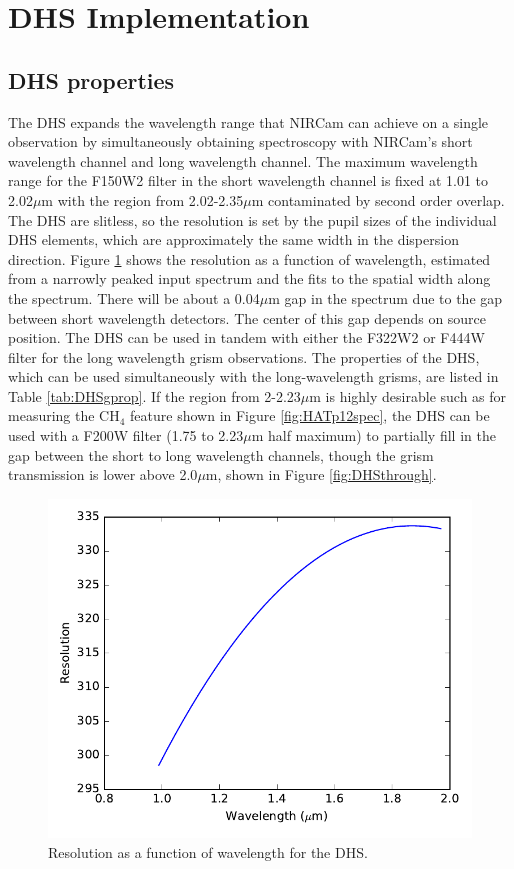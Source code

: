 \documentclass[iop]{emulateapj}
\newcommand{\DHSgap}{0.04}
\begin{document}
\section{DHS Implementation}\label{sec:implementation}

\subsection{DHS properties}
The DHS expands the wavelength range that NIRCam can achieve on a single observation by simultaneously obtaining spectroscopy with NIRCam's short wavelength channel and long wavelength channel.
The maximum wavelength range for the F150W2 filter in the short wavelength channel is fixed at 1.01 to 2.02$\mu$m with the region from 2.02-2.35$\mu$m contaminated by second order overlap.
The DHS are slitless, so the resolution is set by the pupil sizes of the individual DHS elements, which are approximately the same width in the dispersion direction.
Figure \ref{fig:DHSRes} shows the resolution as a function of wavelength, estimated from a narrowly peaked input spectrum and the fits to the spatial width along the spectrum.
There will be about a \DHSgap$\mu$m gap in the spectrum due to the gap between short wavelength detectors.
The center of this gap depends on source position.
The DHS can be used in tandem with either the F322W2 or F444W filter for the long wavelength grism observations.
The properties of the DHS, which can be used simultaneously with the long-wavelength grisms, are listed in Table \ref{tab:DHSgprop}.
If the region from 2-2.23$\mu$m is highly desirable such as for measuring the CH$_4$ feature shown in Figure \ref{fig:HATp12spec}, the DHS can be used with a F200W filter (1.75 to 2.23$\mu$m half maximum) to partially fill in the gap between the short to long wavelength channels, though the grism transmission is lower above 2.0$\mu$m, shown in Figure \ref{fig:DHSthrough}. 


\begin{figure}[!ht]
\centering
\includegraphics[width=1.0\columnwidth]{dhs_res.pdf}
\caption{Resolution as a function of wavelength for the DHS.}\label{fig:DHSRes}
\end{figure}
\end{document}
